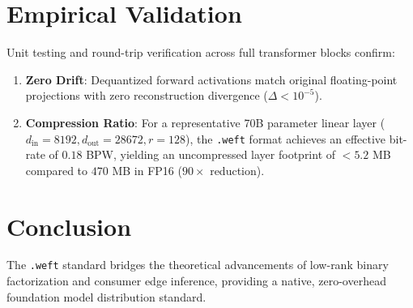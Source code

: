 \documentclass[11pt,a4paper]{article}
\begin{document}
\section{Empirical Validation}
Unit testing and round-trip verification across full transformer blocks confirm:
\begin{enumerate}
    \item \textbf{Zero Drift}: Dequantized forward activations match original floating-point projections with zero reconstruction divergence ($\Delta < 10^{-5}$).
    \item \textbf{Compression Ratio}: For a representative 70B parameter linear layer ($d_{\text{in}}=8192, d_{\text{out}}=28672, r=128$), the \texttt{.weft} format achieves an effective bit-rate of $0.18$ BPW, yielding an uncompressed layer footprint of $< 5.2$ MB compared to $470$ MB in FP16 ($90\times$ reduction).
\end{enumerate}

\section{Conclusion}
The \texttt{.weft} standard bridges the theoretical advancements of low-rank binary factorization and consumer edge inference, providing a native, zero-overhead foundation model distribution standard.
\end{document}
